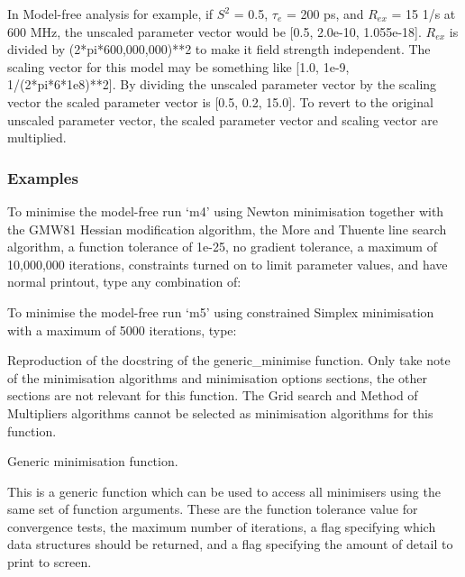 In Model-free analysis for example, if $S^2$ = 0.5, $\tau_e$ = 200 ps, and $R_{ex}$ = 15 1/s at 600 MHz,
the unscaled parameter vector would be [0.5, 2.0e-10, 1.055e-18].  $R_{ex}$ is divided by
(2*pi*600,000,000)**2 to make it field strength independent.  The scaling vector for this
model may be something like [1.0, 1e-9, 1/(2*pi*6*1e8)**2].  By dividing the unscaled
parameter vector by the scaling vector the scaled parameter vector is [0.5, 0.2, 15.0].  To
revert to the original unscaled parameter vector, the scaled parameter vector and scaling
vector are multiplied.


\subsubsection{Examples}

To minimise the model-free run `m4' using Newton minimisation together with the GMW81
Hessian modification algorithm, the More and Thuente line search algorithm, a function
tolerance of 1e-25, no gradient tolerance, a maximum of 10,000,000 iterations, constraints
turned on to limit parameter values, and have normal printout, type any combination of:





To minimise the model-free run `m5' using constrained Simplex minimisation with a maximum of
5000 iterations, type:




Reproduction of the docstring of the generic\_minimise function.  Only take note of the
minimisation algorithms and minimisation options sections, the other sections are not
relevant for this function.  The Grid search and Method of Multipliers algorithms cannot be
selected as minimisation algorithms for this function.


Generic minimisation function.

This is a generic function which can be used to access all minimisers using the same set of
function arguments.  These are the function tolerance value for convergence tests, the maximum
number of iterations, a flag specifying which data structures should be returned, and a flag
specifying the amount of detail to print to screen.


